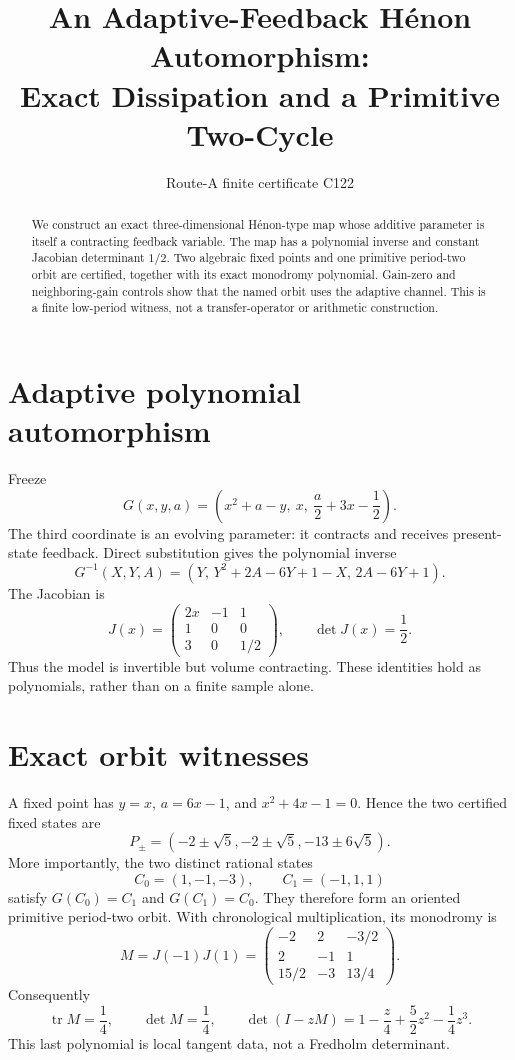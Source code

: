 \documentclass[10pt]{article}
\title{An Adaptive-Feedback H\'enon Automorphism:\\
Exact Dissipation and a Primitive Two-Cycle}
\author{Route-A finite certificate C122}
\date{}
\begin{document}
\maketitle
\begin{abstract}
We construct an exact three-dimensional H\'enon-type map whose additive
parameter is itself a contracting feedback variable.  The map has a polynomial
inverse and constant Jacobian determinant $1/2$.  Two algebraic fixed points
and one primitive period-two orbit are certified, together with its exact
monodromy polynomial.  Gain-zero and neighboring-gain controls show that the
named orbit uses the adaptive channel.  This is a finite low-period witness,
not a transfer-operator or arithmetic construction.
\end{abstract}

\section{Adaptive polynomial automorphism}
Freeze
\[
 G(x,y,a)=\left(x^2+a-y,\ x,\ \frac a2+3x-\frac12\right).
\]
The third coordinate is an evolving parameter: it contracts and receives
present-state feedback.  Direct substitution gives the polynomial inverse
\[
 G^{-1}(X,Y,A)=\left(Y,\,Y^2+2A-6Y+1-X,\,2A-6Y+1\right).
\]
The Jacobian is
\[
 J(x)=\begin{pmatrix}2x&-1&1\\1&0&0\\3&0&1/2\end{pmatrix},
 \qquad \det J(x)=\frac12.
\]
Thus the model is invertible but volume contracting.  These identities hold
as polynomials, rather than on a finite sample alone.

\section{Exact orbit witnesses}
A fixed point has $y=x$, $a=6x-1$, and
$x^2+4x-1=0$.  Hence the two certified fixed states are
\[
 P_{\pm}=(-2\pm\sqrt5,-2\pm\sqrt5,-13\pm6\sqrt5).
\]
More importantly, the two distinct rational states
\[
 C_0=(1,-1,-3),\qquad C_1=(-1,1,1)
\]
satisfy $G(C_0)=C_1$ and $G(C_1)=C_0$.  They therefore form an oriented
primitive period-two orbit.  With chronological multiplication, its
monodromy is
\[
 M=J(-1)J(1)=
 \begin{pmatrix}
 -2&2&-3/2\\2&-1&1\\15/2&-3&13/4
 \end{pmatrix}.
\]
Consequently
\[
 \operatorname{tr}M=\frac14,\qquad \det M=\frac14,
 \qquad
 \det(I-zM)=1-\frac z4+\frac52z^2-\frac14z^3.
\]
This last polynomial is local tangent data, not a Fredholm determinant.
\end{document}

